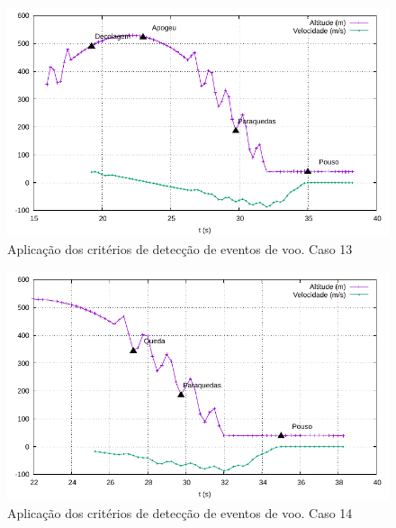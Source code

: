 \documentclass[12pt,a4paper]{article}
\begin{document}
\begin{figure}[!ht]
	\centering
	\includegraphics[width=\textwidth]{./data/cases/case13/trajectory}
	\caption{Aplicação dos critérios de detecção de eventos de voo. Caso 13}
	\label{fig:case13}
\end{figure}
\begin{figure}[!ht]
	\centering
	\includegraphics[width=\textwidth]{./data/cases/case14/trajectory}
	\caption{Aplicação dos critérios de detecção de eventos de voo. Caso 14}
	\label{fig:case14}
\end{figure}
\end{document}
